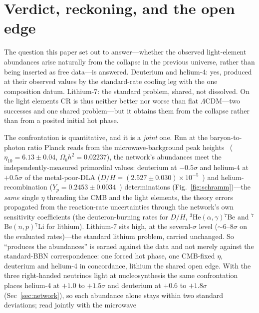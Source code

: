 \documentclass[11pt,a4paper]{article}
\theoremstyle{plain}
\theoremstyle{definition}
\theoremstyle{remark}
\begin{document}
\section{Verdict, reckoning, and the open edge}\label{sec:verdict}
The question this paper set out to answer---whether the observed light-element abundances arise
naturally from the collapse in the previous universe, rather than being inserted as free
data---is answered. Deuterium and helium-4: yes, produced at their observed values by the standard-rate cooling leg with the one composition datum. Lithium-7: the standard problem,
shared, not dissolved. On the light elements CR is thus neither better nor worse than flat
$\Lambda$CDM---two successes and one shared problem---but it obtains them from the collapse
rather than from a posited initial hot phase.

The confrontation is quantitative, and it is a \emph{joint} one. Run at the baryon-to-photon
ratio Planck reads from the microwave-background peak heights~\cite{Planck2018} ($\eta_{10}=6.13\pm0.04$,
$\Omega_bh^2=0.02237$), the network's abundances meet the independently-measured primordial values:
deuterium at $-0.5\sigma$ and helium-4 at $+0.5\sigma$ of the metal-poor-DLA ($D/H=(2.527\pm0.030)\times10^{-5}$~\cite{Cooke2018}) and helium-recombination ($Y_p=0.2453\pm0.0034$~\cite{Aver2021})
determinations (Fig.~\ref{fig:schramm})---the \emph{same} single $\eta$ threading the CMB and the
light elements, the theory errors propagated from the reaction-rate uncertainties through the
network's own sensitivity coefficients (the deuteron-burning rates for $D/H$, ${}^3$He$(\alpha,\gamma){}^7$Be
and ${}^7$Be$(n,p){}^7$Li for lithium). Lithium-7 sits high, at the several-$\sigma$ level (${\sim}6$--$8\sigma$
on the evaluated rates)---the standard lithium problem, carried
unchanged. So ``produces the abundances'' is earned against the data and not merely against the
standard-BBN correspondence: one forced hot phase, one CMB-fixed $\eta$, deuterium and helium-4 in
concordance, lithium the shared open edge. With the three right-handed neutrinos light at nucleosynthesis
the same confrontation places helium-4 at $+1.0$ to $+1.5\sigma$ and deuterium at $+0.6$ to $+1.8\sigma$
(Sec~\ref{sec:network}), so each abundance alone stays within two standard deviations; read jointly with the microwave
\end{document}
